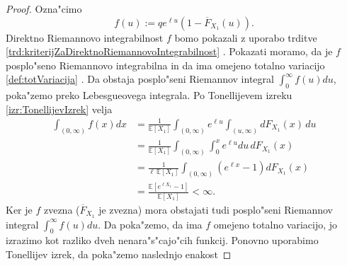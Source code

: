 \documentclass[12pt, a4paper, reqno]{amsart}
\theoremstyle{definition}
\theoremstyle{plain}
\newcommand{\E}{\mathbb{E}}
\newcommand{\1}{\mathds{1}}
\newcommand*{\refPriloga}[1]{%
  \begingroup
    \hypersetup{
      linkcolor=red,
      linkbordercolor=red,
    }%
    \ref{#1}%
  \endgroup
}
\begin{document}
\begin{proof}
                \pagebreak 
                \noindent
                Ozna"cimo 
                \begin{equation*}
                    f(u) := qe^{\ell u}(1 - \overline{F}_{X_1}(u)).
                \end{equation*}
                Direktno Riemannovo integrabilnost $f$ bomo pokazali z uporabo trditve \refPriloga{trd:kriterijZaDirektnoRiemannovoIntegrabilnost}. 
                Pokazati moramo, da je $f$ posplo"seno Riemannovo integrabilna in da ima omejeno totalno variacijo \refPriloga{def:totVariacija}. 
                \noindent
                Da obstaja posplo"seni Riemannov integral $\int_0^\infty f(u)du$, poka"zemo preko Lebesgueovega integrala. 
                Po Tonellijevem izreku \refPriloga{izr:TonellijevIzrek} velja
                \begin{align*}
                    \int_{(0, \infty)}f(x)dx &= \frac{1}{\E\left[X_1\right]}\int_{(0, \infty)}e^{\ell u}\int_{(u, \infty)}dF_{X_1}(x)\,du \\
                    &= \frac{1}{\E\left[X_1\right]}\int_{(0, \infty)}\int_0^xe^{\ell u}du\, dF_{X_1}(x) \\
                    &= \frac{1}{\ell\, \E\left[X_1\right]} \int_{(0, \infty)}\left(e^{\ell x} - 1\right)dF_{X_1}(x) \\
                    &= \frac{\E\left[e^{\ell X_1} - 1\right]}{\E\left[X_1\right]} < \infty.
                \end{align*}
                Ker je $f$ zvezna ($\overline{F}_{X_1}$ je zvezna) mora obstajati tudi posplo"seni Riemannov integral $\int_0^\infty f(u)du$.
                Da poka"zemo, da ima $f$ omejeno totalno variacijo, jo izrazimo kot razliko 
                dveh nenara"s"cajo"cih funkcij. Ponovno uporabimo Tonellijev izrek, da poka"zemo naslednjo enakost

\end{proof}
\end{document}

